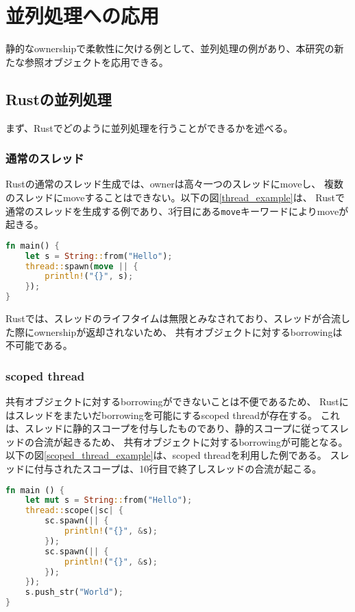\documentclass{sumiilab-paper}
\theoremstyle{mystyle}
\numberwithin{definition}{chapter} %
\begin{document}
\chapter{並列処理への応用}
静的なownershipで柔軟性に欠ける例として、並列処理の例があり、本研究の新たな参照オブジェクトを応用できる。

\section{Rustの並列処理}
まず、Rustでどのように並列処理を行うことができるかを述べる。
\subsection{通常のスレッド}
Rustの通常のスレッド生成では、ownerは高々一つのスレッドにmoveし、
複数のスレッドにmoveすることはできない。以下の図\ref{thread_example}は、
Rustで通常のスレッドを生成する例であり、3行目にある\texttt{move}キーワードによりmoveが起きる。
\begin{lstlisting}[language=Rust, caption=Rustでの通常のスレッド生成の例, 
  label=thread_example, captionpos=b]
fn main() {
    let s = String::from("Hello");
    thread::spawn(move || {
        println!("{}", s);
    });
}
\end{lstlisting}

Rustでは、スレッドのライフタイムは無限とみなされており、スレッドが合流した際にownershipが返却されないため、
共有オブジェクトに対するborrowingは不可能である。

\subsection{scoped thread}
共有オブジェクトに対するborrowingができないことは不便であるため、
Rustにはスレッドをまたいだborrowingを可能にするscoped threadが存在する。
これは、スレッドに静的スコープを付与したものであり、静的スコープに従ってスレッドの合流が起きるため、
共有オブジェクトに対するborrowingが可能となる。
以下の図\ref{scoped_thread_example}は、scoped threadを利用した例である。
スレッドに付与されたスコープは、10行目で終了しスレッドの合流が起こる。
\begin{lstlisting}[language=Rust, caption=scoped threadの例, label=scoped_thread_example, captionpos=b]
fn main () {
    let mut s = String::from("Hello");
    thread::scope(|sc| {
        sc.spawn(|| {
            println!("{}", &s);
        });
        sc.spawn(|| {
            println!("{}", &s);
        });
    });
    s.push_str("World");
}
\end{lstlisting}
\end{document}

